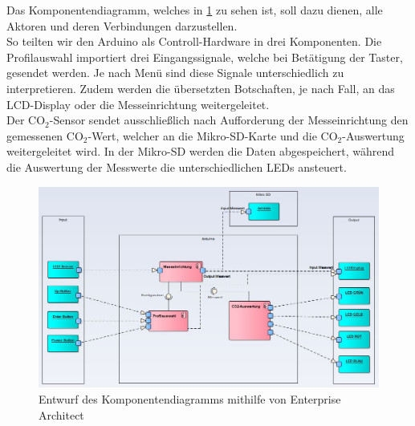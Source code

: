 \label{Komponentendiagramm}

Das Komponentendiagramm, welches in \ref{fig:KomponentenDiagramm} zu sehen ist, soll dazu dienen, alle Aktoren und deren Verbindungen darzustellen. \\
So teilten wir den Arduino als Controll-Hardware in drei Komponenten. Die Profilauswahl importiert drei Eingangssignale, welche bei Betätigung der Taster, gesendet werden. Je nach Menü sind diese Signale unterschiedlich zu interpretieren. Zudem werden die übersetzten Botschaften, je nach Fall, an das \ac{LCD}-Display oder die Messeinrichtung weitergeleitet. \\
Der CO$_2$-Sensor sendet ausschließlich nach Aufforderung der Messeinrichtung den gemessenen CO$_2$-Wert, welcher an die Mikro-SD-Karte und die CO$_2$-Auswertung weitergeleitet wird. In der Mikro-SD werden die Daten abgespeichert, während die Auswertung der Messwerte die unterschiedlichen \ac{LED}s ansteuert.

\begin{figure}[!hbt]
	\centering
	\includegraphics[width=0.9\linewidth]{Images/Komponentendiagramm}
	\caption{Entwurf des Komponentendiagramms mithilfe von Enterprise Architect}
	\label{fig:KomponentenDiagramm}
\end{figure}